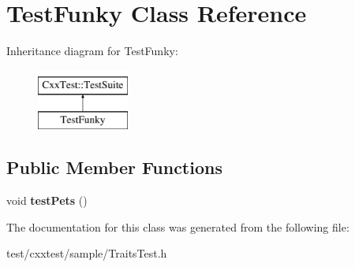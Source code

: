 \hypertarget{classTestFunky}{\section{Test\-Funky Class Reference}
\label{classTestFunky}
}
Inheritance diagram for Test\-Funky\-:\begin{figure}[H]
\begin{center}
\leavevmode
\includegraphics[height=2.000000cm]{classTestFunky}
\end{center}
\end{figure}
\subsection*{Public Member Functions}
\begin{DoxyCompactItemize}
\item 
\hypertarget{classTestFunky_a23e991d183e3e9ab22fe5ce37176a0cb}{void {\bfseries test\-Pets} ()}\label{classTestFunky_a23e991d183e3e9ab22fe5ce37176a0cb}

\end{DoxyCompactItemize}


The documentation for this class was generated from the following file\-:\begin{DoxyCompactItemize}
\item 
test/cxxtest/sample/Traits\-Test.\-h\end{DoxyCompactItemize}
